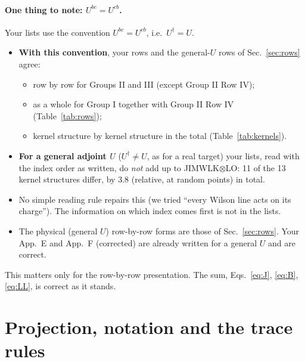 \documentclass[10pt]{article}
\numberwithin{equation}{section}
\begin{document}
\paragraph{One thing to note: $U^{bc}=U^{cb}$.} Your lists use the convention $U^{bc}=U^{cb}$, i.e.\ $U^\dagger=U$.
\begin{itemize}
\item \textbf{With this convention}, your rows and the general-$U$ rows of Sec.~\ref{sec:rows} agree:
\begin{itemize}
\item row by row for Groups II and III (except Group II Row IV);
\item as a whole for Group I together with Group II Row IV (Table~\ref{tab:rows});
\item kernel structure by kernel structure in the total (Table~\ref{tab:kernels}).
\end{itemize}
\item \textbf{For a general adjoint $U$} ($U^\dagger\ne U$, as for a real target) your lists, read with the index order as written, do \emph{not} add up to JIMWLK$\otimes$LO: 11 of the 13 kernel structures differ, by 3.8 (relative, at random points) in total.
\item No simple reading rule repairs this (we tried ``every Wilson line acts on its charge''). The information on which index comes first is not in the lists.
\item The physical (general $U$) row-by-row forms are those of Sec.~\ref{sec:rows}. Your App.~E and App.~F (corrected) are already written for a general $U$ and are correct.
\end{itemize}
This matters only for the row-by-row presentation. The sum, Eqs.~\eqref{eq:J}, \eqref{eq:B}, \eqref{eq:LL}, is correct as it stands.

\section{Projection, notation and the trace rules}\label{sec:rules}
\end{document}
